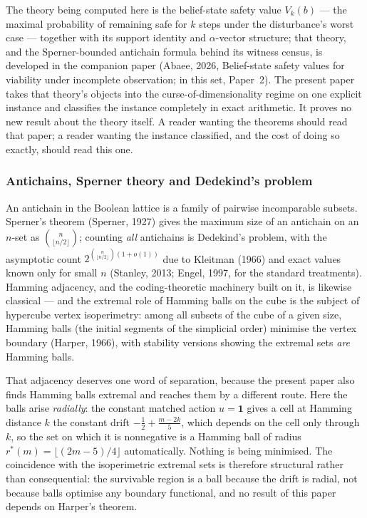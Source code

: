 \documentclass[10pt,twocolumn]{article}
\theoremstyle{plain}
\theoremstyle{definition}
\theoremstyle{remark}
\begin{document}
The theory being computed here is the belief-state safety value \(V_k(b)\) --- the maximal
probability of remaining safe for \(k\) steps under the disturbance's worst case --- together
with its support identity and \(\alpha\)-vector structure; that theory, and the
Sperner-bounded antichain formula behind its witness census, is developed in the companion
paper (Abaee, 2026, Belief-state safety values for viability under incomplete observation;
in this set, Paper~2). The present paper takes that theory's objects into the
curse-of-dimensionality regime on one explicit instance and classifies the instance
completely in exact arithmetic. It proves no new result about the theory itself. A reader
wanting the theorems should read that paper; a reader wanting the instance classified, and
the cost of doing so exactly, should read this one.

\subsubsection{Antichains, Sperner theory and Dedekind's problem}

An antichain in the Boolean lattice is a family of pairwise incomparable subsets. Sperner's
theorem (Sperner, 1927) gives the maximum size of an antichain on an \(n\)-set as
\(\binom{n}{\lfloor n/2\rfloor}\); counting \emph{all} antichains is Dedekind's problem,
with the asymptotic count \(2^{\binom{n}{\lfloor n/2\rfloor}(1+o(1))}\) due to Kleitman
(1966) and exact values known only for small \(n\) (Stanley, 2013; Engel, 1997, for the
standard treatments). Hamming adjacency, and the coding-theoretic machinery built on it, is
likewise classical --- and the extremal role of Hamming balls on the cube is the subject of
hypercube vertex isoperimetry: among all subsets of the cube of a given size, Hamming balls
(the initial segments of the simplicial order) minimise the vertex boundary (Harper, 1966),
with stability versions showing the extremal sets \emph{are} Hamming balls.

That adjacency deserves one word of separation, because the present paper also finds Hamming
balls extremal and reaches them by a different route. Here the balls arise \emph{radially}: the
constant matched action \(u = \mathbf{1}\) gives a cell at Hamming distance \(k\) the constant
drift \(-\tfrac12 + \tfrac{m-2k}{5}\), which depends on the cell only through \(k\), so the set
on which it is nonnegative is a Hamming ball of radius \(r^{*}(m) = \lfloor (2m-5)/4\rfloor\)
automatically. Nothing is being minimised. The coincidence with the isoperimetric extremal sets
is therefore structural rather than consequential: the survivable region is a ball because the
drift is radial, not because balls optimise any boundary functional, and no result of this
paper depends on Harper's theorem.
\end{document}
